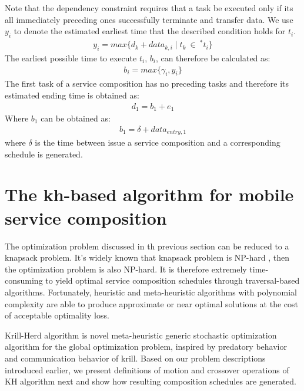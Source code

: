 \documentclass[journal]{IEEEtran}
\begin{document}
Note that the dependency constraint requires that a task be executed only if its all immediately preceding ones successfully terminate and transfer data. We use $y_i$ to denote the estimated earliest time that the described condition holds for $t_i$.
\begin{align}
y_i = max \{d_k + data_{k,i} \mid t_k \ \in \ ^{*}t_i \} 
\end{align}
The earliest possible time to execute $t_i$, $b_i$, can therefore be calculated as:
\begin{align}
b_i = max \{ \gamma_i, y_i \}
\end{align}
The first task of a service composition has no preceding tasks and therefore its estimated ending time is obtained as:
\begin{align}
d_1 = b_1 + e_1
\end{align}
Where $b_1$ can be obtained as:
\begin{align}
b_1 = \delta + data_{entry, 1}
\end{align}
where $\delta$ is the time between issue a service composition and a corresponding schedule is generated.




\section{The kh-based algorithm for mobile service composition}

The optimization problem discussed in th previous section can be reduced to a knapsack problem. It's widely known that knapsack problem is NP-hard \cite{papadimitriou1998combinatorial}, then the optimization problem is also NP-hard. It is therefore extremely time-consuming to yield optimal service composition schedules through traversal-based algorithms. Fortunately, heuristic and meta-heuristic algorithms with polynomial complexity are able to produce approximate or near optimal solutions at the cost of acceptable optimality loss.

Krill-Herd algorithm \cite{gandomi2012krill} is novel meta-heuristic generic stochastic optimization algorithm for the global optimization problem, inspired by predatory behavior and communication behavior of krill. 
Based on our problem descriptions introduced earlier, we present definitions of motion and crossover operations of KH algorithm next and show how resulting composition schedules are generated.
\end{document}
